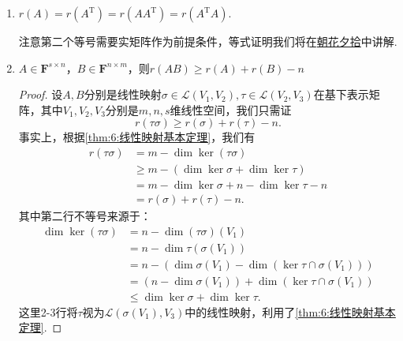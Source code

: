 \begin{enumerate}
          \begin{proof}
            我们有$\sigma(V_1)\subseteq V_2$（回忆像空间是到达空间的子空间），故$(\tau\sigma)(V_1)\subseteq\tau(V_2)$，因此$\dim(\tau\sigma)(V_1)\leqslant\dim\tau(V_2)$，即$r(\tau\sigma)\leqslant r(\tau)$.

            因为$(\tau\sigma)(V_1)=\tau(\sigma(V_1))$，我们知道线性映射不能把低维空间满射到更高维的空间，因此$\dim(\tau\sigma)(V_1)=\dim\tau(\sigma(V_1))\leqslant\dim\sigma(V_1)$，即$r(\tau\sigma)\leqslant r(\sigma)$，综上$r(\tau\sigma)\leqslant \min\{r(\sigma), r(\tau)\}$，得证.
          \end{proof}

          事实上，这一不等式我们将在\hyperref[chap:朝花夕拾]{朝花夕拾}中用线性方程组的理论再给出一个证明.

    \item $r(A)=r(A^\mathrm{T})=r(AA^\mathrm{T})=r(A^\mathrm{T}A)$.

          注意第二个等号需要实矩阵作为前提条件，等式证明我们将在\hyperref[chap:朝花夕拾]{朝花夕拾}中讲解.

    \item $A \in \mathbf{F}^{s \times n}$，$B \in \mathbf{F}^{n \times m}$，则$r(AB) \geqslant r(A)+r(B)-n$

          \begin{proof}
            设$A,B$分别是线性映射$\sigma\in\mathcal{L}(V_1,V_2),\tau\in\mathcal{L}(V_2,V_3)$在基下表示矩阵，其中$V_1,V_2,V_3$分别是$m,n,s$维线性空间，我们只需证
            \[r(\tau\sigma)\geqslant r(\sigma)+r(\tau)-n.\]
            事实上，根据\autoref{thm:6:线性映射基本定理}，我们有
            \begin{align*}
                r(\tau\sigma)&=m-\dim\ker(\tau\sigma) \\
                &\geqslant m-(\dim\ker\sigma+\dim\ker\tau) \\
                &=m-\dim\ker\sigma+n-\dim\ker\tau-n \\
                &=r(\sigma)+r(\tau)-n.
            \end{align*}
            其中第二行不等号来源于：
            \begin{align*}
                \dim\ker(\tau\sigma)&=n-\dim(\tau\sigma)(V_1) \\
                &=n-\dim\tau(\sigma(V_1)) \\
                &=n-(\dim\sigma(V_1)-\dim(\ker\tau\cap\sigma(V_1))) \\
                &=(n-\dim\sigma(V_1))+\dim(\ker\tau\cap\sigma(V_1)) \\
                &\leqslant\dim\ker\sigma+\dim\ker\tau.
            \end{align*}
            这里2-3行将$\tau$视为$\mathcal{L}(\sigma(V_1),V_3)$中的线性映射，利用了\autoref{thm:6:线性映射基本定理}.
          \end{proof}


\end{enumerate}
